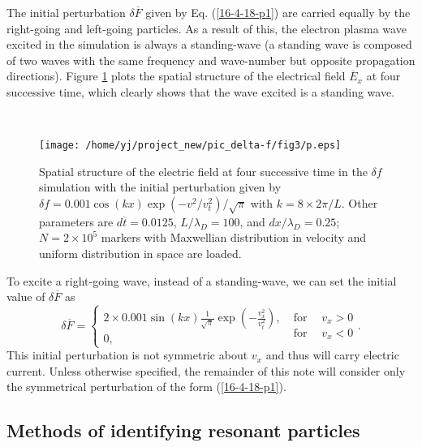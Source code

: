 \documentclass{article}
\newcommand{\tmop}[1]{\ensuremath{\operatorname{#1}}}
\begin{document}
The initial perturbation $\delta \overline{F}$ given by Eq. (\ref{16-4-18-p1})
are carried equally by the right-going and left-going particles. As a result
of this, the electron plasma wave excited in the simulation is always a
standing-wave (a standing wave is composed of two waves with the same
frequency and wave-number but opposite propagation directions). Figure
\ref{16-4-11-p1} plots the spatial structure of the electrical field
$\overline{E}_x$ at four successive time, which clearly shows that the wave
excited is a standing wave.

\

\begin{figure}[h]
  \texttt{[image: /home/yj/project\_new/pic\_delta-f/fig3/p.eps]}
  \caption{\label{16-4-11-p1}Spatial structure of the electric field at four
  successive time in the $\delta f$ simulation with the initial perturbation
  given by $\delta f = 0.001 \cos (k x) \exp (- v^2 / v_t^2) / \sqrt{\pi}$
  with $k = 8 \times 2 \pi / L$. Other parameters are $d \overline{t} =
  0.0125$, $L / \lambda_D = 100$, and $d x / \lambda_D = 0.25$; $N = 2 \times
  10^5$ markers with Maxwellian distribution in velocity and uniform
  distribution in space are loaded.}
\end{figure}

To excite a right-going wave, instead of a standing-wave, we can set the
initial value of $\delta \overline{F}$ as
\begin{equation}
  \delta \overline{F} = \left\{ \begin{array}{l}
    2 \times 0.001 \sin (k x) \frac{1}{\sqrt{\pi}} \exp \left( -
    \frac{v^2_x}{v_t^2} \right),\\
    0,
  \end{array} \right. \begin{array}{l}
    \tmop{for} \quad v_x > 0\\
    \tmop{for} \quad v_x < 0
  \end{array} .
\end{equation}
This initial perturbation is not symmetric about $v_x$ and thus will carry
electric current. Unless otherwise specified, the remainder of this note will
consider only the symmetrical perturbation of the form (\ref{16-4-18-p1}).

\subsection{Methods of identifying resonant particles}
\end{document}
